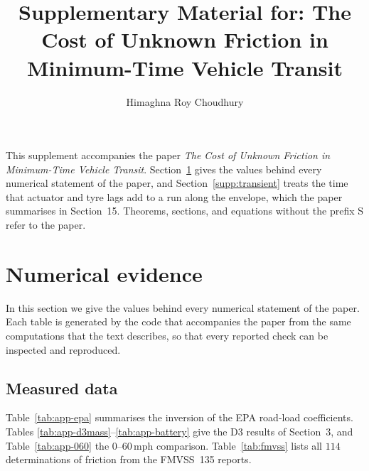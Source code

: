 \documentclass[12pt, twoside]{amsart}
\title[Supplementary Material]{Supplementary Material for: The Cost of Unknown Friction in
Minimum-Time Vehicle Transit}
\author{Himaghna Roy Choudhury}
\theoremstyle{definition}
\newcommand{\mainref}[2]{#2}
\begin{document}
\maketitle

This supplement accompanies the paper \emph{The Cost of Unknown Friction in Minimum-Time Vehicle
Transit}. Section~\ref{supp:evidence} gives the values behind every numerical statement of the
paper, and Section~\ref{supp:transient} treats the time that actuator and tyre lags add to a run along the
envelope, which the paper summarises in Section~\mainref{sec:discussion}{15}. Theorems, sections, and equations without the prefix S
refer to the paper.

\section{Numerical evidence}\label{supp:evidence}

In this section we give the values behind every numerical statement of the paper. Each table is
generated by the code that accompanies the paper from the same computations that the text describes,
so that every reported check can be inspected and reproduced.

\subsection{Measured data}

Table~\ref{tab:app-epa} summarises the inversion of the EPA road-load coefficients. Tables
\ref{tab:app-d3mass}--\ref{tab:app-battery} give the D3 results of Section~\mainref{sec:data}{3}, and
Table~\ref{tab:app-060} the $0$--$60$\,mph comparison. Table~\ref{tab:fmvss} lists all $114$
determinations of friction from the FMVSS~135 reports.
\end{document}
